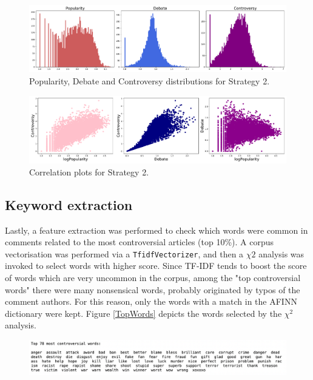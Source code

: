 \begin{figure}
\centering
\includegraphics[width=\tw]{Pictures/Strat2Dist.pdf}
\caption{Popularity, Debate and Controversy distributions for Strategy 2.}
\label{Str1Dist}
\end{figure}


\begin{figure}[tb]
\centering
\includegraphics[width=\tw]{Pictures/Strat2Corr.pdf}
\caption{Correlation plots for Strategy 2.}
\label{Str1Corr}
\end{figure}


\subsection{Keyword extraction}
Lastly, a feature extraction was performed to check which words were common in comments related to the most controversial articles (top 10\%). A corpus vectorisation was performed via a {\tt TfidfVectorizer}, and then a $\chi2$ analysis was invoked to select words with higher score. Since TF-IDF tends to boost the score of words which are very uncommon in the corpus, among the "top controversial words" there were many nonsensical words, probably originated by typos of the comment authors. For this reason, only the words with a match in the AFINN dictionary were kept. Figure \ref{TopWords} depicts the words selected by the $\chi^2$ analysis.

\begin{figure}
\centering
\includegraphics[width=\tw]{Pictures/TopWs.png}
\end{figure}